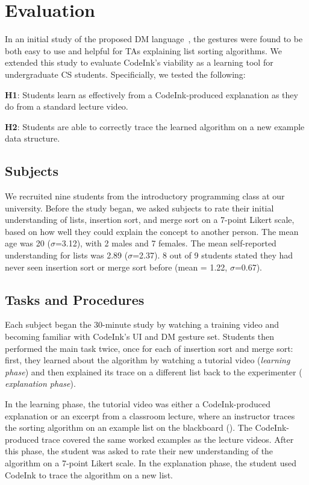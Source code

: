 \section{Evaluation}

In an initial study of the proposed DM language~\cite{Scott2014}, the gestures
were found to be both easy to use and helpful for TAs explaining list sorting
algorithms. We extended this study to evaluate CodeInk's viability as a learning
tool for undergraduate CS students. Specificially, we tested the following:

\noindent \textbf{H1}: Students learn as effectively from a CodeInk-produced
explanation as they do from a standard lecture video.

\noindent \textbf{H2}: Students are able to correctly trace the learned
algorithm on a new example data structure.

\subsection{Subjects}
We recruited nine students from the introductory programming class at our
university. Before the study began, we asked subjects to rate their initial
understanding of lists, insertion sort, and merge sort on a 7-point Likert
scale, based on how well they could explain the concept to another person. The
mean age was 20 ($\sigma$=3.12), with 2 males and 7 females. The mean
self-reported understanding for lists was 2.89 ($\sigma$=2.37).
8 out of 9 students stated they had never seen insertion sort or merge sort
before (mean = 1.22, $\sigma$=0.67).

\subsection{Tasks and Procedures}
Each subject began the 30-minute study by watching a training video and becoming
familiar with CodeInk's UI and DM gesture set. Students then performed the main
task twice, once for each of insertion sort and merge sort: first, they learned
about the algorithm by watching a tutorial video ({\em learning phase}) and then
explained its trace on a different list back to the experimenter ({\em
explanation phase}).

In the learning phase, the tutorial video was either a CodeInk-produced
explanation or an excerpt from a classroom lecture, where an instructor traces
the sorting algorithm on an example list on the blackboard
(). The CodeInk-produced trace covered the same worked
examples as the lecture videos. After this phase, the student was asked to rate
their new understanding of the algorithm on a 7-point Likert scale. In the
explanation phase, the student used CodeInk to trace the algorithm on a new
list.

